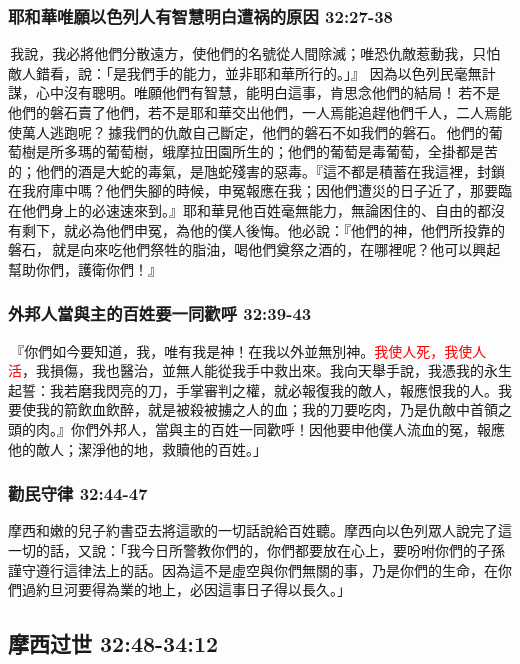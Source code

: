 \subsubsection{耶和華唯願以色列人有智慧明白遭祸的原因 32:27-38}
 我說，我必將他們分散遠方，使他們的名號從人間除滅；唯恐仇敵惹動我，只怕敵人錯看，說：「是我們手的能力，並非耶和華所行的。」』 因為以色列民毫無計謀，心中沒有聰明。唯願他們有智慧，能明白這事，肯思念他們的結局！ 若不是他們的磐石賣了他們，若不是耶和華交出他們，一人焉能追趕他們千人，二人焉能使萬人逃跑呢？ 據我們的仇敵自己斷定，他們的磐石不如我們的磐石。 他們的葡萄樹是所多瑪的葡萄樹，蛾摩拉田園所生的；他們的葡萄是毒葡萄，全掛都是苦的；他們的酒是大蛇的毒氣，是虺蛇殘害的惡毒。『這不都是積蓄在我這裡，封鎖在我府庫中嗎？他們失腳的時候，申冤報應在我；因他們遭災的日子近了，那要臨在他們身上的必速速來到。』耶和華見他百姓毫無能力，無論困住的、自由的都沒有剩下，就必為他們申冤，為他的僕人後悔。他必說：『他們的神，他們所投靠的磐石， 就是向來吃他們祭牲的脂油，喝他們奠祭之酒的，在哪裡呢？他可以興起幫助你們，護衛你們！』

\subsubsection{外邦人當與主的百姓要一同歡呼 32:39-43}
 『你們如今要知道，我，唯有我是神！在我以外並無別神。\textcolor{red}{我使人死，我使人活}，我損傷，我也醫治，並無人能從我手中救出來。我向天舉手說，我憑我的永生起誓：我若磨我閃亮的刀，手掌審判之權，就必報復我的敵人，報應恨我的人。我要使我的箭飲血飲醉，就是被殺被擄之人的血；我的刀要吃肉，乃是仇敵中首領之頭的肉。』你們外邦人，當與主的百姓一同歡呼！因他要申他僕人流血的冤，報應他的敵人；潔淨他的地，救贖他的百姓。」



\subsubsection{勸民守律 32:44-47 }
摩西和嫩的兒子約書亞去將這歌的一切話說給百姓聽。摩西向以色列眾人說完了這一切的話，又說：「我今日所警教你們的，你們都要放在心上，要吩咐你們的子孫謹守遵行這律法上的話。因為這不是虛空與你們無關的事，乃是你們的生命，在你們過約旦河要得為業的地上，必因這事日子得以長久。」

\subsection{摩西过世 32:48-34:12}
